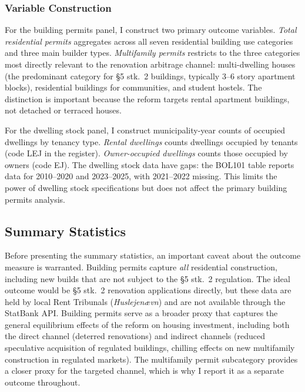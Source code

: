 \documentclass[12pt]{article}
\begin{document}
\subsubsection*{Variable Construction} For the building permits panel, I construct two primary outcome variables. \emph{Total residential permits} aggregates across all seven residential building use categories and three main builder types. \emph{Multifamily permits} restricts to the three categories most directly relevant to the renovation arbitrage channel: multi-dwelling houses (the predominant category for \S5 stk.\ 2 buildings, typically 3--6 story apartment blocks), residential buildings for communities, and student hostels. The distinction is important because the reform targets rental apartment buildings, not detached or terraced houses.

For the dwelling stock panel, I construct municipality-year counts of occupied dwellings by tenancy type. \emph{Rental dwellings} counts dwellings occupied by tenants (code LEJ in the register). \emph{Owner-occupied dwellings} counts those occupied by owners (code EJ). The dwelling stock data have gaps: the BOL101 table reports data for 2010--2020 and 2023--2025, with 2021--2022 missing. This limits the power of dwelling stock specifications but does not affect the primary building permits analysis.

\subsection{Summary Statistics}



Before presenting the summary statistics, an important caveat about the outcome measure is warranted. Building permits capture \emph{all} residential construction, including new builds that are not subject to the \S5 stk.\ 2 regulation. The ideal outcome would be \S5 stk.\ 2 renovation applications directly, but these data are held by local Rent Tribunals (\emph{Huslejen{\ae}vn}) and are not available through the StatBank API. Building permits serve as a broader proxy that captures the general equilibrium effects of the reform on housing investment, including both the direct channel (deterred renovations) and indirect channels (reduced speculative acquisition of regulated buildings, chilling effects on new multifamily construction in regulated markets). The multifamily permit subcategory provides a closer proxy for the targeted channel, which is why I report it as a separate outcome throughout.
\end{document}
